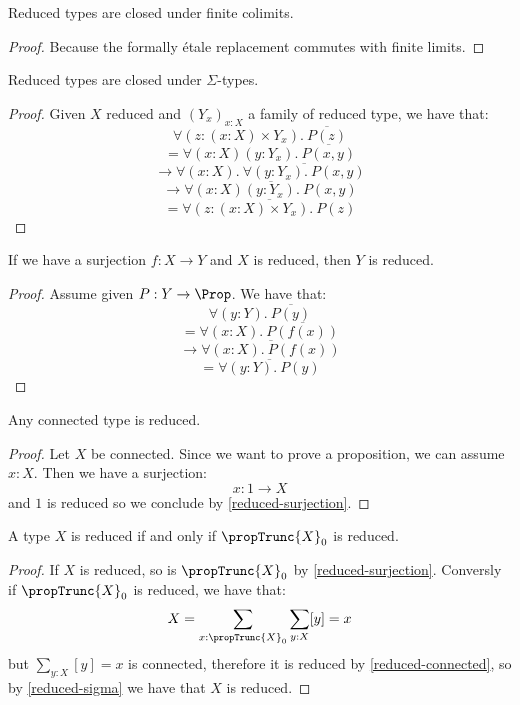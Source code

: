 \begin{lemma}\label{reduced-colimit}
Reduced types are closed under finite colimits.
\end{lemma}

\begin{proof}
Because the formally étale replacement commutes with finite limits.
\end{proof}

\begin{lemma}\label{reduced-sigma}
Reduced types are closed under $\Sigma$-types.
\end{lemma}

\begin{proof}
Given $X$ reduced and $(Y_x)_{x:X}$ a family of reduced type, we have that:
\[\forall (z:(x:X)\times Y_x).\ \overline{P(z)} \]
\[= \forall (x:X)(y:Y_x).\ \overline{P(x,y)} \]
\[\to \forall (x:X).\ \overline{\forall (y:Y_x).\ P(x,y)} \]
\[\to \overline{\forall (x:X)(y:Y_x).\ P(x,y)} \]
\[= \overline{\forall (z:(x:X)\times Y_x).\ P(z)}\]
\end{proof}

\begin{lemma}\label{reduced-surjection}
If we have a surjection $f:X\to Y$ and $X$ is reduced, then $Y$ is reduced.
\end{lemma}

\begin{proof}
Assume given $P:Y\to\Prop$. We have that:
\[\forall(y:Y).\ \overline{P(y)}\]
\[= \forall(x:X).\ \overline{P(f(x))}\]
\[\to \overline{\forall(x:X).\ P(f(x))}\]
\[= \overline{\forall(y:Y).\ P(y)}\]
\end{proof}

\begin{lemma}\label{reduced-connected}
Any connected type is reduced.
\end{lemma}

\begin{proof}
Let $X$ be connected. Since we want to prove a proposition, we can assume $x:X$. Then we have a surjection:
\[x:1\to X\]
and $1$ is reduced so we conclude by \cref{reduced-surjection}.
\end{proof}

\begin{lemma}
A type $X$ is reduced if and only if $\propTrunc{X}_0$ is reduced.
\end{lemma}

\begin{proof}
If $X$ is reduced, so is $\propTrunc{X}_0$ by \cref{reduced-surjection}. Conversly if $\propTrunc{X}_0$ is reduced, we have that:
\[X = \sum_{x:\propTrunc{X}_0} \sum_{y:X} [y] = x\]
but $\sum_{y:X} [y] = x$ is connected, therefore it is reduced by \cref{reduced-connected}, so by \cref{reduced-sigma} we have that $X$ is reduced.
\end{proof}

